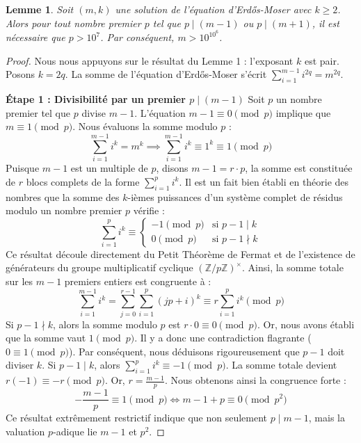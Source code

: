 \documentclass[11pt,a4paper,french]{article}
\newtheorem{lemma}[theorem]{Lemme}
\theoremstyle{definition}
\theoremstyle{remark}
\begin{document}
\begin{lemma}
Soit $(m, k)$ une solution de l'équation d'Erdős-Moser avec $k \ge 2$. Alors pour tout nombre premier $p$ tel que $p \mid (m-1)$ ou $p \mid (m+1)$, il est nécessaire que $p > 10^7$. Par conséquent, $m > 10^{10^6}$.
\end{lemma}

\begin{proof}
Nous nous appuyons sur le résultat du Lemme 1 : l'exposant $k$ est pair. Posons $k = 2q$.
La somme de l'équation d'Erdős-Moser s'écrit $\sum_{i=1}^{m-1} i^{2q} = m^{2q}$.

\textbf{Étape 1 : Divisibilité par un premier $p \mid (m-1)$}
Soit $p$ un nombre premier tel que $p$ divise $m-1$. L'équation $m-1 \equiv 0 \pmod p$ implique que $m \equiv 1 \pmod p$.
Nous évaluons la somme modulo $p$ :
\begin{equation}
\sum_{i=1}^{m-1} i^k = m^k \implies \sum_{i=1}^{m-1} i^k \equiv 1^k \equiv 1 \pmod p
\end{equation}
Puisque $m-1$ est un multiple de $p$, disons $m-1 = r \cdot p$, la somme est constituée de $r$ blocs complets de la forme $\sum_{i=1}^{p} i^k$.
Il est un fait bien établi en théorie des nombres que la somme des $k$-ièmes puissances d'un système complet de résidus modulo un nombre premier $p$ vérifie :
\begin{equation}
\sum_{i=1}^{p} i^k \equiv
\begin{cases}
-1 \pmod p & \text{si } p-1 \mid k \\
0 \pmod p & \text{si } p-1 \nmid k
\end{cases}
\end{equation}
Ce résultat découle directement du Petit Théorème de Fermat et de l'existence de générateurs du groupe multiplicatif cyclique $(\mathbb{Z}/p\mathbb{Z})^\times$.
Ainsi, la somme totale sur les $m-1$ premiers entiers est congruente à :
\begin{equation}
\sum_{i=1}^{m-1} i^k = \sum_{j=0}^{r-1} \sum_{i=1}^{p} (jp+i)^k \equiv r \sum_{i=1}^{p} i^k \pmod p
\end{equation}
Si $p-1 \nmid k$, alors la somme modulo $p$ est $r \cdot 0 \equiv 0 \pmod p$. Or, nous avons établi que la somme vaut $1 \pmod p$. Il y a donc une contradiction flagrante ($0 \equiv 1 \pmod p$).
Par conséquent, nous déduisons rigoureusement que $p-1$ doit diviser $k$.
Si $p-1 \mid k$, alors $\sum_{i=1}^{p} i^k \equiv -1 \pmod p$.
La somme totale devient $r(-1) \equiv -r \pmod p$.
Or, $r = \frac{m-1}{p}$. Nous obtenons ainsi la congruence forte :
\begin{equation}
-\frac{m-1}{p} \equiv 1 \pmod p \iff m-1 + p \equiv 0 \pmod{p^2}
\end{equation}
Ce résultat extrêmement restrictif indique que non seulement $p \mid m-1$, mais la valuation $p$-adique lie $m-1$ et $p^2$.


\end{proof}
\end{document}
